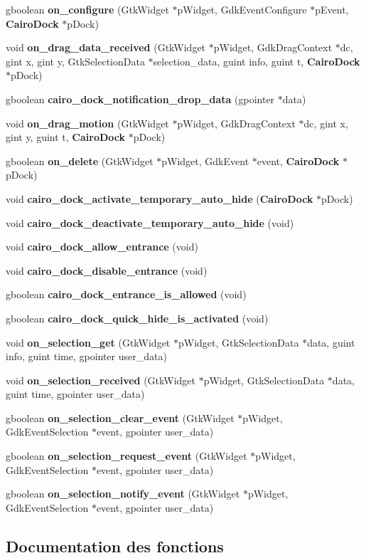 \begin{CompactItemize}
gboolean {\bf on\_\-configure} (GtkWidget $\ast$pWidget, GdkEventConfigure $\ast$pEvent, {\bf CairoDock} $\ast$pDock)
\item 
void {\bf on\_\-drag\_\-data\_\-received} (GtkWidget $\ast$pWidget, GdkDragContext $\ast$dc, gint x, gint y, GtkSelectionData $\ast$selection\_\-data, guint info, guint t, {\bf CairoDock} $\ast$pDock)
\item 
gboolean {\bf cairo\_\-dock\_\-notification\_\-drop\_\-data} (gpointer $\ast$data)
\item 
void {\bf on\_\-drag\_\-motion} (GtkWidget $\ast$pWidget, GdkDragContext $\ast$dc, gint x, gint y, guint t, {\bf CairoDock} $\ast$pDock)
\item 
gboolean {\bf on\_\-delete} (GtkWidget $\ast$pWidget, GdkEvent $\ast$event, {\bf CairoDock} $\ast$pDock)
\item 
void {\bf cairo\_\-dock\_\-activate\_\-temporary\_\-auto\_\-hide} ({\bf CairoDock} $\ast$pDock)
\item 
void {\bf cairo\_\-dock\_\-deactivate\_\-temporary\_\-auto\_\-hide} (void)
\item 
void {\bf cairo\_\-dock\_\-allow\_\-entrance} (void)
\item 
void {\bf cairo\_\-dock\_\-disable\_\-entrance} (void)
\item 
gboolean {\bf cairo\_\-dock\_\-entrance\_\-is\_\-allowed} (void)
\item 
gboolean {\bf cairo\_\-dock\_\-quick\_\-hide\_\-is\_\-activated} (void)
\item 
void {\bf on\_\-selection\_\-get} (GtkWidget $\ast$pWidget, GtkSelectionData $\ast$data, guint info, guint time, gpointer user\_\-data)
\item 
void {\bf on\_\-selection\_\-received} (GtkWidget $\ast$pWidget, GtkSelectionData $\ast$data, guint time, gpointer user\_\-data)
\item 
gboolean {\bf on\_\-selection\_\-clear\_\-event} (GtkWidget $\ast$pWidget, GdkEventSelection $\ast$event, gpointer user\_\-data)
\item 
gboolean {\bf on\_\-selection\_\-request\_\-event} (GtkWidget $\ast$pWidget, GdkEventSelection $\ast$event, gpointer user\_\-data)
\item 
gboolean {\bf on\_\-selection\_\-notify\_\-event} (GtkWidget $\ast$pWidget, GdkEventSelection $\ast$event, gpointer user\_\-data)
\end{CompactItemize}


\subsection{Documentation des fonctions}
